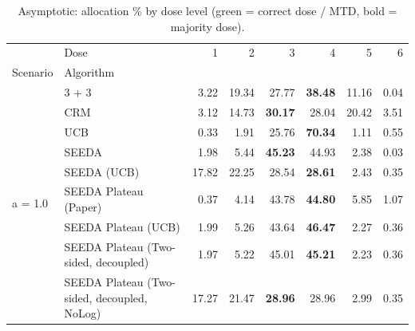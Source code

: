 \begin{table}[H]
\centering
\caption{Asymptotic: allocation \% by dose level (green = correct dose / MTD, bold = majority dose).}
\label{tab:asym_alloc_by_dose}
\begin{tabular}{llrrrrrr}
\toprule
 & Dose & 1 & 2 & 3 & 4 & 5 & 6 \\
Scenario & Algorithm &  &  &  &  &  &  \\
\midrule
\multirow[c]{9}{*}{a = 1.0} & 3 + 3 & 3.22 & 19.34 & {\cellcolor[HTML]{C8E6C9}} 27.77 & \bfseries 38.48 & 11.16 & 0.04 \\
 & CRM & 3.12 & 14.73 & {\cellcolor[HTML]{C8E6C9}} \bfseries 30.17 & 28.04 & 20.42 & 3.51 \\
 & UCB & 0.33 & 1.91 & {\cellcolor[HTML]{C8E6C9}} 25.76 & \bfseries 70.34 & 1.11 & 0.55 \\
 & SEEDA & 1.98 & 5.44 & {\cellcolor[HTML]{C8E6C9}} \bfseries 45.23 & 44.93 & 2.38 & 0.03 \\
 & SEEDA (UCB) & 17.82 & 22.25 & {\cellcolor[HTML]{C8E6C9}} 28.54 & \bfseries 28.61 & 2.43 & 0.35 \\
 & SEEDA Plateau (Paper) & 0.37 & 4.14 & {\cellcolor[HTML]{C8E6C9}} 43.78 & \bfseries 44.80 & 5.85 & 1.07 \\
 & SEEDA Plateau (UCB) & 1.99 & 5.26 & {\cellcolor[HTML]{C8E6C9}} 43.64 & \bfseries 46.47 & 2.27 & 0.36 \\
 & SEEDA Plateau (Two-sided, decoupled) & 1.97 & 5.22 & {\cellcolor[HTML]{C8E6C9}} 45.01 & \bfseries 45.21 & 2.23 & 0.36 \\
 & SEEDA Plateau (Two-sided, decoupled, NoLog) & 17.27 & 21.47 & {\cellcolor[HTML]{C8E6C9}} \bfseries 28.96 & 28.96 & 2.99 & 0.35 \\
\bottomrule
\end{tabular}
\end{table}
